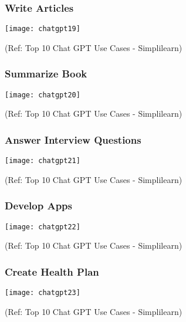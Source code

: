 \begin{frame}[fragile]\frametitle{Write Articles}
\begin{center}
\texttt{[image: chatgpt19]}
\end{center}

{\tiny (Ref: Top 10 Chat GPT Use Cases - Simplilearn)}
\end{frame}

\begin{frame}[fragile]\frametitle{Summarize Book}
\begin{center}
\texttt{[image: chatgpt20]}
\end{center}

{\tiny (Ref: Top 10 Chat GPT Use Cases - Simplilearn)}
\end{frame}

\begin{frame}[fragile]\frametitle{Answer Interview Questions}
\begin{center}
\texttt{[image: chatgpt21]}
\end{center}

{\tiny (Ref: Top 10 Chat GPT Use Cases - Simplilearn)}
\end{frame}



\begin{frame}[fragile]\frametitle{Develop Apps}
\begin{center}
\texttt{[image: chatgpt22]}
\end{center}

{\tiny (Ref: Top 10 Chat GPT Use Cases - Simplilearn)}
\end{frame}

\begin{frame}[fragile]\frametitle{Create Health Plan}
\begin{center}
\texttt{[image: chatgpt23]}
\end{center}

{\tiny (Ref: Top 10 Chat GPT Use Cases - Simplilearn)}
\end{frame}

